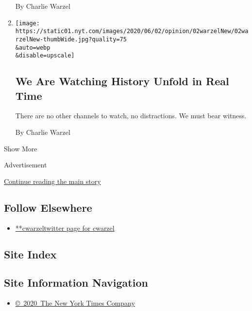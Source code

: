 \begin{enumerate}
  By Charlie Warzel
\item
  \href{/2020/06/02/opinion/floyd-protest-twitter.html}{}

  \texttt{[image: https://static01.nyt.com/images/2020/06/02/opinion/02warzelNew/02warzelNew-thumbWide.jpg?quality=75\\\&auto=webp\\\&disable=upscale]}

  \hypertarget{we-are-watching-history-unfold-in-real-time}{%
  \subsection{We Are Watching History Unfold in Real
  Time}\label{we-are-watching-history-unfold-in-real-time}}

  There are no other channels to watch, no distractions. We must bear
  witness.

  By Charlie Warzel
\end{enumerate}

Show More

Advertisement

\protect\hyperlink{after-mid2}{Continue reading the main story}

\hypertarget{follow-elsewhere}{%
\subsection{Follow Elsewhere}\label{follow-elsewhere}}

\begin{itemize}
\tightlist
\item
  \href{https://twitter.com/cwarzel}{**cwarzeltwitter page for cwarzel}
\end{itemize}

\hypertarget{site-index}{%
\subsection{Site Index}\label{site-index}}

\hypertarget{site-information-navigation}{%
\subsection{Site Information
Navigation}\label{site-information-navigation}}

\begin{itemize}
\tightlist
\item
  \href{https://help.nytimes.com/hc/en-us/articles/115014792127-Copyright-notice}{©~2020~The
  New York Times Company}
\end{itemize}

